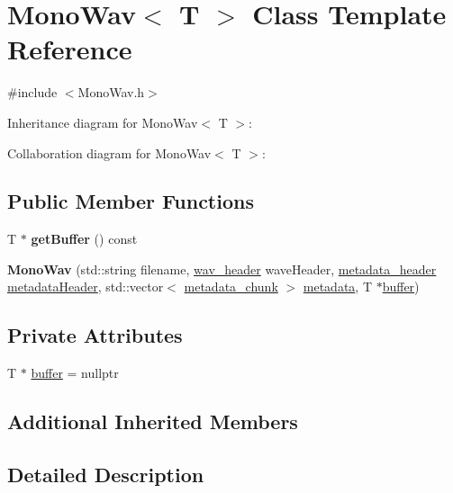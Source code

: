 \hypertarget{classMonoWav}{}\section{Mono\+Wav$<$ T $>$ Class Template Reference}
\label{classMonoWav}


{\ttfamily \#include $<$Mono\+Wav.\+h$>$}



Inheritance diagram for Mono\+Wav$<$ T $>$\+:


Collaboration diagram for Mono\+Wav$<$ T $>$\+:
\subsection*{Public Member Functions}
\begin{DoxyCompactItemize}
\item 
\mbox{\label{classMonoWav_a00a063b3e0ba8bbbc93798f0439b182b}} 
T $\ast$ {\bfseries get\+Buffer} () const
\item 
\mbox{\label{classMonoWav_a9f05de08c8d61eb1078c2fdcbb05cf5b}} 
{\bfseries Mono\+Wav} (std\+::string filename, \hyperlink{structwav__header}{wav\+\_\+header} wave\+Header, \hyperlink{structmetadata__header}{metadata\+\_\+header} \hyperlink{classWav_a4ddb72dc81101f50ef1f6c4d0e8dc257}{metadata\+Header}, std\+::vector$<$ \hyperlink{structmetadata__chunk}{metadata\+\_\+chunk} $>$ \hyperlink{classWav_a69b39a8dd2ddd962b6acb966e0f454ee}{metadata}, T $\ast$\hyperlink{classMonoWav_a5ca6f817d4a63a7688e0781bb40e4570}{buffer})
\end{DoxyCompactItemize}
\subsection*{Private Attributes}
\begin{DoxyCompactItemize}
\item 
T $\ast$ \hyperlink{classMonoWav_a5ca6f817d4a63a7688e0781bb40e4570}{buffer} = nullptr
\end{DoxyCompactItemize}
\subsection*{Additional Inherited Members}


\subsection{Detailed Description}
